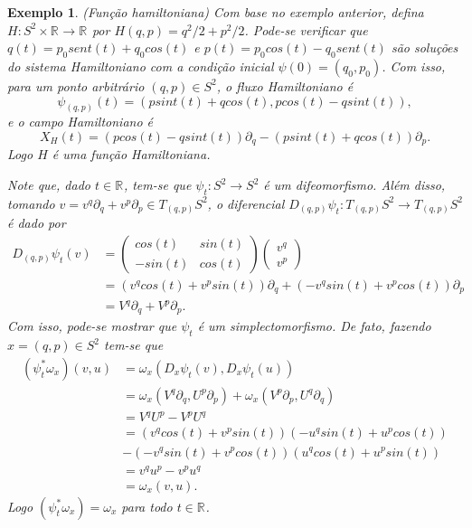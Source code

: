 \documentclass[12pt]{book}
\newtheorem{exemplo}[teorema]{Exemplo}
\newcommand{\campohamiltonianoabrev}{X_{H}}
\newcommand{\real}[1]{\mathbb{R}^{#1}}
\newcommand{\reta}{\real{}}
\begin{document}
	\begin{exemplo}
		(Função hamiltoniana) Com base no exemplo anterior, defina $H:S^{2}\times \reta\to \reta$ por $H(q,p) = q^{2}/2+p^{2}/2$. Pode-se verificar que $q(t) = p_{0}sent(t)+q_{0}cos(t)$ e $p(t) = p_{0}cos(t)-q_{0}sent(t)$ são soluções do sistema Hamiltoniano com a condição inicial $\psi(0) = (q_{0}, p_{0})$. Com isso, para um ponto arbitrário $(q,p) \in S^{2}$, o fluxo Hamiltoniano é
		$$
		\psi_{(q,p)}(t)=(psint(t)+qcos(t), pcos(t)-qsint(t)),
		$$
		e o campo Hamiltoniano é 
		$$
		\campohamiltonianoabrev(t) = (pcos(t)-qsint(t))\partial_{q}-(psint(t)+qcos(t))\partial_{p}.
		$$
		Logo $H$ é uma função Hamiltoniana.
		
		Note que, dado $t \in \reta$, tem-se que $\psi_{t}:S^{2}\to S^{2}$ é um difeomorfismo. Além disso, tomando $v =v^{q} \partial_{q}+v^{p} \partial_{p}\in T_{(q,p)}S^{2}$, o diferencial $	D_{(q,p)}\psi_{t}:T_{(q,p)}S^{2}\to T_{(q,p)}S^{2}$ é dado por
		$$
		\begin{aligned}
			D_{(q,p)}\psi_{t}(v)
			&=\left(
				\begin{array}{cc}
				cos(t) & sin(t)
				\\
				-sin(t)& cos(t)
				\end{array}
				\right) \left(
						\begin{array}{c}
						v^{q}
						\\
						v^{p}
						\end{array}
						\right) 
			\\
			&=(v^{q}cos(t)+v^{p}sin(t)) \partial_{q}+(-v^{q}sin(t)+v^{p}cos(t)) \partial_{p}
			\\
			&=V^{q} \partial_{q}+V^{p} \partial_{p}.		 
		\end{aligned}
		$$
		Com isso, pode-se mostrar que $\psi_{t}$ é um simplectomorfismo. De fato, fazendo $x=(q,p)\in S^{2}$ tem-se que
		$$
		\begin{aligned}
			(\psi^{*}_{t}\omega_{x})(v,u)
			&=\omega_{x}(D_{x}\psi_{t}(v), D_{x}\psi_{t}(u))
			\\
			&=\omega_{x}(V^{q}\partial_{q}, U^{p}\partial_{p} )	+\omega_{x}(V^{p}\partial_{p}, U^{q}\partial_{q} )
			\\
			&=V^{q}U^{p}-V^{p}U^{q}
			\\
			&=(v^{q}cos(t)+v^{p}sin(t))(-u^{q}sin(t)+u^{p}cos(t))
			\\
			&-(-v^{q}sin(t)+v^{p}cos(t))(u^{q}cos(t)+u^{p}sin(t))
			\\
			&=v^{q}u^{p}-v^{p}u^{q}
			\\
			&=\omega_{x}(v,u).
		\end{aligned}
		$$
		Logo $	(\psi^{*}_{t}\omega_{x}) = \omega_{x}$ para todo $t\in \reta$.
	\end{exemplo}
	
\end{document}
